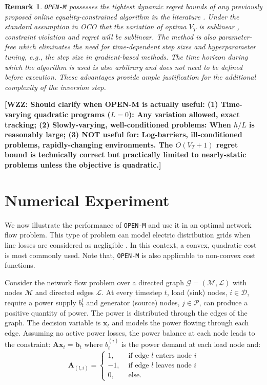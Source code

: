 \documentclass[journal,twoside,web]{ieeecolor}
\newtheorem{remark}{Remark}
\newcommand{\xx}{\mathbf{x}}
\newcommand{\bb}{\mathbf{b}}
\renewcommand{\AA}{\mathbf{A}}
\newcommand{\WZZsuggestion}[1]{{\color{green2}\bf{[WZZ: #1]}}}
\begin{document}
{\begin{remark}\label{remark2}
\texttt{OPEN-M} possesses the tightest dynamic regret bounds of any previously proposed online equality-constrained algorithm in the literature \cite{MOSP, QueueConstrained,LagrangianTime-Varying, DynamicPolyak}. Under the standard assumption in OCO that the variation of optima $V_T$ is sublinear \cite{LagrangianTime-Varying}, constraint violation and regret will be sublinear. The method is also parameter-free which eliminates the need for time-dependent step sizes and hyperparameter tuning, e.g., the step size in gradient-based methods. The time horizon during which the algorithm is used is also arbitrary and does not need to be defined before execution. These advantages provide ample justification for the additional complexity of the inversion step. \end{remark} }
\WZZsuggestion{Should clarify when OPEN-M is actually useful:
(1) Time-varying quadratic programs ($L=0$): Any variation allowed, exact tracking;
(2) Slowly-varying, well-conditioned problems: When $h/L$ is reasonably large;
(3) NOT useful for: Log-barriers, ill-conditioned problems, rapidly-changing environments.
The $O(V_T+1)$ regret bound is technically correct but practically limited to nearly-static problems
unless the objective is quadratic.}



\section{Numerical Experiment}
We now illustrate the performance of \texttt{OPEN-M} and use it in an optimal network flow problem. This type of problem can model electric distribution grids when line losses are considered as negligible \cite{NetworkFlow, NetFlow2}. In this context, a convex, quadratic cost is most commonly used. Note that, \texttt{OPEN-M} is also applicable to non-convex cost functions.

Consider the network flow problem over a directed graph $\mathcal{G}=(\mathcal{M}, \mathcal{L})$ with nodes $\mathcal{M}$ and directed edges $\mathcal{L}$. At every timestep $t$, load (sink) nodes, $i\in \mathcal{D}$, require a power supply $b_t^{i}$ and generator (source) nodes, $j\in \mathcal{P}$, can produce a positive quantity of power. The power is distributed through the edges of the graph. The decision variable is $\xx_t$ and models the power flowing through each edge. Assuming no active power losses, the power balance at each node leads to the constraint:
$\AA\xx_t=\bb_t$ where $b_t^{(i)}$ is the power demand at each load node and:
\begin{align*}\AA_{(l, i)} = \begin{cases}1, &\text{ if edge } l \text{ enters node } i\\-1, &\text{ if edge } l \text{ leaves node } i\\0, &\text{ else}.\end{cases}\end{align*}
\end{document}
